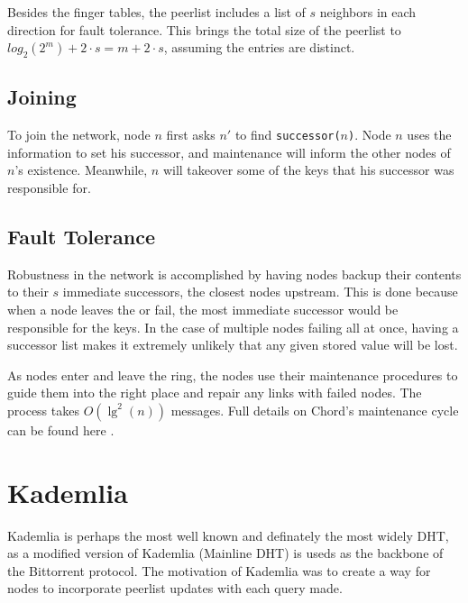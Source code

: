 Besides the finger tables, the peerlist includes a list of $s$ neighbors in each direction for fault tolerance.
This brings the total size of the peerlist to $log_{2}(2^{m})  + 2 \cdot s =  m  + 2 \cdot s$, assuming the entries are distinct.

\subsection*{Joining}
To join the network, node $n$ first asks $n'$ to find \texttt{successor($ n $)}. 
Node $n$ uses the information to set his successor, and maintenance will inform the other nodes of $n$'s existence.
Meanwhile, $n$ will takeover some of the keys that his successor was responsible for.

\subsection*{Fault Tolerance}
Robustness in the network is accomplished by having nodes backup their contents to their $s$ immediate successors, the closest nodes upstream. 
This is done because when a node leaves the or fail, the most immediate successor would be responsible for the keys.
In the case of multiple nodes failing all at once, having a successor list makes it extremely unlikely that any given stored value will be lost.

As nodes enter and leave the ring, the nodes use their maintenance procedures to guide them into the right place and repair any links with failed nodes.  
The process takes $O(\lg^{2}(n))$ messages.
Full details on Chord's maintenance cycle can be found here \cite{chord}.






\section{Kademlia}
Kademlia \cite{kademlia}  is perhaps the most well known and definately the most widely DHT, as a modified version of Kademlia (Mainline DHT) is useds as the backbone of the Bittorrent protocol.
The motivation of Kademlia was to create a way for nodes to incorporate peerlist updates with each query made.

